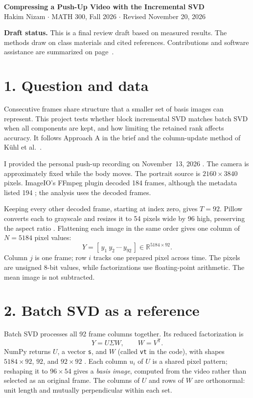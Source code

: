 \documentclass[11pt,a4paper]{article}
\newcommand{\code}[1]{\texttt{#1}}
\begin{document}
\begingroup\centering
{\Large\bfseries Compressing a Push-Up Video with the Incremental SVD}\\[5pt]
Hakim Nizam \(\cdot\) MATH 300, Fall 2026 \(\cdot\) Revised November 20, 2026
\par\endgroup

\begingroup\small
\textbf{Draft status.} This is a final review draft based on measured
results. The methods draw on class materials and cited references.
Contributions and software assistance are summarized on
page~\pageref{sec:class-notes}.
\endgroup

\section*{1. Question and data}

Consecutive frames share structure that a smaller set of basis images can
represent. This project tests whether block incremental SVD matches batch
SVD when all components are kept, and how limiting the retained rank affects
accuracy. It follows Approach A in the brief \cite{brief} and the
column-update method of K\"uhl et al.\ \cite{kuhl}.

I provided the personal push-up recording on November~13, 2026
\cite{video}. The camera is approximately fixed while the body moves.
The portrait source is \(2160\times3840\) pixels. ImageIO's FFmpeg plugin
decoded 184 frames, although the metadata listed 194 \cite{imageio};
the analysis uses the decoded frames.

Keeping every other decoded frame, starting at index zero, gives \(T=92\).
Pillow converts each to grayscale and resizes it to 54 pixels wide by
96 high, preserving the aspect ratio \cite{pillow}. Flattening each image
in the same order \cite{numpy,sep18} gives one column of \(N=5184\) pixel values:
\[
Y=[\,y_1\ y_2\ \cdots\ y_{92}\,]\in\mathbb{R}^{5184\times92}.
\]
Column \(j\) is one frame; row \(i\) tracks one prepared pixel across time.
The pixels are unsigned 8-bit values, while factorizations use floating-point
arithmetic. The mean image is not subtracted.

\section*{2. Batch SVD as a reference}

Batch SVD processes all 92 frame columns
together. Its reduced factorization is
\[
Y=U\Sigma W,\qquad W=V^{\mathsf T}.
\]
NumPy returns \(U\), a vector \code{s}, and \(W\) (called \code{vt} in the
code), with shapes \(5184\times92\), \(92\), and \(92\times92\)
\cite{numpy,nov9}. Each column \(u_i\) of \(U\) is a shared pixel pattern;
reshaping it to \(96\times54\) gives a \emph{basis image}, computed from the
video rather than selected as an original frame. The columns of \(U\) and
rows of \(W\) are orthonormal: unit length and mutually perpendicular within
each set.
\end{document}
